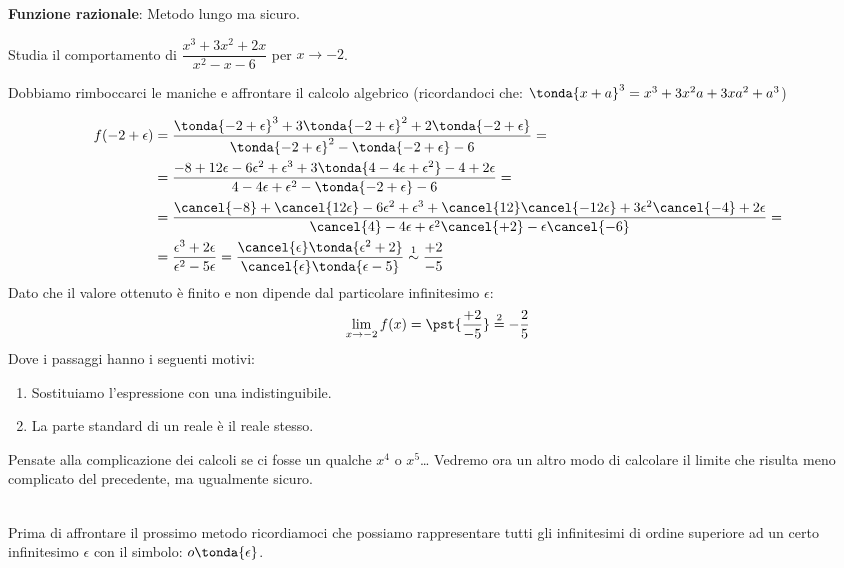 \begin{esempio}
\textbf{Funzione razionale}: Metodo lungo ma sicuro.

Studia il comportamento di \(\dfrac{x^3+3x^2+2x}{x^2-x-6}\) per 
\(x \to -2\).

Dobbiamo rimboccarci le maniche e affrontare il calcolo algebrico 
(ricordandoci che: \(\tonda{x+a}^3= x^3+3x^2a+3xa^2+a^3\))

\begin{align*}
f(-2+\epsilon)& = \frac
  {\tonda{-2+\epsilon}^3+3\tonda{-2+\epsilon}^2+2\tonda{-2+\epsilon}}
  {\tonda{-2+\epsilon}^2-\tonda{-2+\epsilon}-6} =\\
  &=\frac{-8+12\epsilon-6\epsilon^2+\epsilon^3+
             3\tonda{4-4\epsilon+\epsilon^2}-4+2\epsilon}
             {4-4\epsilon+\epsilon^2-\tonda{-2+\epsilon}-6} =\\ 
  &=\frac{\cancel{-8}+\cancel{12\epsilon}-6\epsilon^2+\epsilon^3+
          \cancel{12}\cancel{-12\epsilon}+3\epsilon^2\cancel{-4}+2\epsilon}
             {\cancel{4}-4\epsilon+
              \epsilon^2\cancel{+2}-\epsilon\cancel{-6}}=\\ 
  &=\frac{\epsilon^3+2\epsilon}{\epsilon^2-5\epsilon} = 
    \frac{\cancel{\epsilon} \tonda{\epsilon^2+2}}
             {\cancel{\epsilon} \tonda{\epsilon-5}} \stackrel{1}{\sim} 
    \frac{+2}{-5}
\end{align*}
Dato che il valore ottenuto è finito e non dipende dal particolare 
infinitesimo \(\epsilon\):
\[
\lim_{x \rightarrow -2} f(x) = \pst{\frac{+2}{-5}} \stackrel{2}{=} 
  -\frac{2}{5}
\]
Dove i passaggi hanno i seguenti motivi:
\begin{enumerate} [nosep]
 \item Sostituiamo l'espressione con una indistinguibile.
 \item La parte standard di un reale è il reale stesso.
\end{enumerate}
\end{esempio}

\begin{osservazione}
Pensate alla complicazione dei calcoli se ci fosse un qualche \(x^4\) o
\(x^5\)\dots
Vedremo ora un altro modo di calcolare il limite che risulta meno 
complicato del precedente, ma ugualmente sicuro.
\end{osservazione}\\

Prima di affrontare il prossimo metodo ricordiamoci che possiamo 
rappresentare tutti gli infinitesimi di ordine superiore ad un certo 
infinitesimo \(\epsilon\) con il simbolo: \(o\tonda{\epsilon}\).


